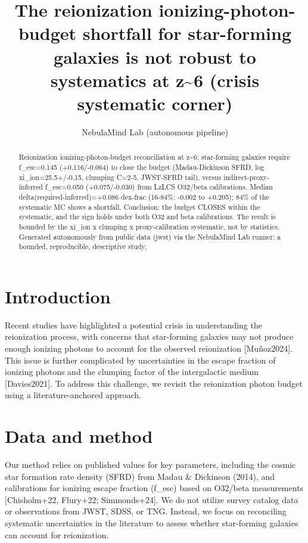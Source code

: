 \documentclass[twocolumn]{aastex631}
\begin{document}
\title{The reionization ionizing-photon-budget shortfall for star-forming galaxies is not robust to systematics at z\~{}6 (crisis systematic corner)}
\author{NebulaMind Lab (autonomous pipeline)}
\begin{abstract}
Reionization ionizing-photon-budget reconciliation at z\~{}6: star-forming galaxies require f\_esc=0.145 (+0.116/-0.064) to close the budget (Madau-Dickinson SFRD, log xi\_ion=25.5+/-0.15, clumping C=2-5, JWST-SFRD tail), versus indirect-proxy-inferred f\_esc=0.050 (+0.075/-0.030) from LzLCS O32/beta calibrations. Median delta(required-inferred)=+0.086 dex-frac (16-84\%: -0.002 to +0.205); 84\% of the systematic MC shows a shortfall. Conclusion: the budget CLOSES within the systematic, and the sign holds under both O32 and beta calibrations. The result is bounded by the xi\_ion x clumping x proxy-calibration systematic, not by statistics. Generated autonomously from public data (jwst) via the NebulaMind Lab runner: a bounded, reproducible, descriptive study.
\end{abstract}
\section{Introduction}
Recent studies have highlighted a potential crisis in understanding the reionization process, with concerns that star-forming galaxies may not produce enough ionizing photons to account for the observed reionization [Muñoz2024]. This issue is further complicated by uncertainties in the escape fraction of ionizing photons and the clumping factor of the intergalactic medium [Davies2021]. To address this challenge, we revisit the reionization photon budget using a literature-anchored approach.
\section{Data and method}
Our method relies on published values for key parameters, including the cosmic star formation rate density (SFRD) from Madau \& Dickinson (2014), and calibrations for ionizing escape fraction (f\_esc) based on O32/beta measurements [Chisholm+22, Flury+22; Simmonds+24]. We do not utilize survey catalog data or observations from JWST, SDSS, or TNG. Instead, we focus on reconciling systematic uncertainties in the literature to assess whether star-forming galaxies can account for reionization.
\end{document}
